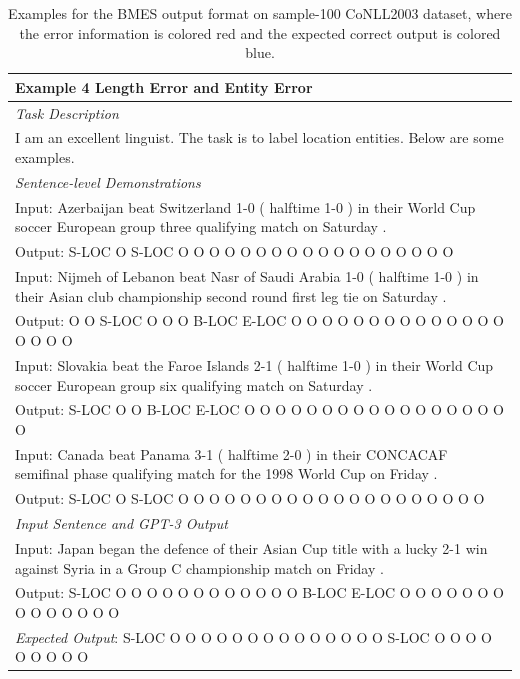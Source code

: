 \documentclass{article}
\begin{document}
\begin{table}[th!]
{\begin{tabular}{l}
\textbf{Example 4 {\color{red} Length Error and Entity Error}} \\\midrule
\textit{Task Description} \\
I am an excellent linguist. The task is to label location entities. Below are some examples. \\\midrule
\textit{Sentence-level Demonstrations} \\
Input: Azerbaijan beat Switzerland 1-0 ( halftime 1-0 ) in their World Cup soccer European group three qualifying match on Saturday . \\
Output: S-LOC O S-LOC O O O O O O O O O O O O O O O O O O \\
Input: Nijmeh of Lebanon beat Nasr of Saudi Arabia 1-0 ( halftime 1-0 ) in their Asian club championship second round first leg tie on Saturday . \\
Output: O O S-LOC O O O B-LOC E-LOC O O O O O O O O O O O O O O O O O O \\
Input: Slovakia beat the Faroe Islands 2-1 ( halftime 1-0 ) in their World Cup soccer European group six qualifying match on Saturday . \\
Output: S-LOC O O B-LOC E-LOC O O O O O O O O O O O O O O O O O O \\
Input: Canada beat Panama 3-1 ( halftime 2-0 ) in their CONCACAF semifinal phase qualifying match for the 1998 World Cup on Friday . \\
Output: S-LOC O S-LOC O O O O O O O O O O O O O O O O O O O O \\\midrule
\textit{Input Sentence and GPT-3 Output} \\
Input: Japan began the defence of their Asian Cup title with a lucky 2-1 win against Syria in a Group C championship match on Friday . \\
Output: S-LOC O O O O O O O O O O O O B-LOC E-LOC O O O O O O O O O O O O O O \\
{\color{blue}\it Expected Output}: S-LOC O O O O O O O O O O O O O O S-LOC O O O O O O O O O \\\bottomrule
    \end{tabular}
    }
     \caption{Examples for the BMES output format on sample-100 CoNLL2003 dataset, where the error information is colored red and the expected correct output is colored blue.}
    \label{tab:bmes_format}
\end{table}
\end{document}
